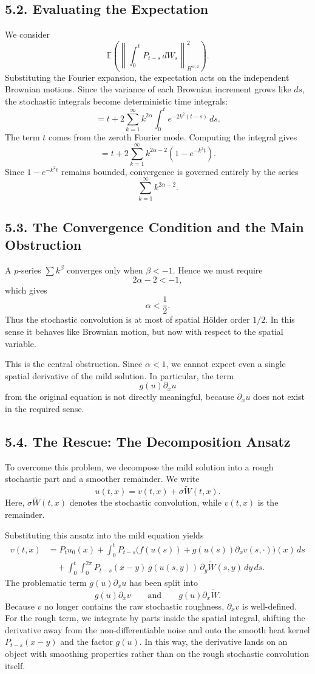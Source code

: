 \documentclass[11pt]{article}
\theoremstyle{definition}
\theoremstyle{remark}
\begin{document}
\subsection*{5.2. Evaluating the Expectation}
We consider
\[
\mathbb E\left(
\left\|
\int_0^t P_{t-s}\,dW_s
\right\|_{H^{\alpha,2}}^2
\right).
\]
Substituting the Fourier expansion, the expectation acts on the independent Brownian motions. Since the variance of each Brownian increment grows like \(ds\), the stochastic integrals become deterministic time integrals:
\[
=
t
+
2\sum_{k=1}^\infty
k^{2\alpha}
\int_0^t e^{-2k^2(t-s)}\,ds.
\]
The term \(t\) comes from the zeroth Fourier mode. Computing the integral gives
\[
=
t
+
2\sum_{k=1}^\infty
k^{2\alpha-2}(1-e^{-k^2 t}).
\]
Since \(1-e^{-k^2 t}\) remains bounded, convergence is governed entirely by the series
\[
\sum_{k=1}^\infty k^{2\alpha-2}.
\]

\subsection*{5.3. The Convergence Condition and the Main Obstruction}
A \(p\)-series \(\sum k^\beta\) converges only when \(\beta<-1\). Hence we must require
\[
2\alpha-2<-1,
\]
which gives
\[
\alpha<\frac12.
\]
Thus the stochastic convolution is at most of spatial Hölder order \(1/2\). In this sense it behaves like Brownian motion, but now with respect to the spatial variable.

This is the central obstruction. Since \(\alpha<1\), we cannot expect even a single spatial derivative of the mild solution. In particular, the term
\[
g(u)\partial_x u
\]
from the original equation is not directly meaningful, because \(\partial_x u\) does not exist in the required sense.

\subsection*{5.4. The Rescue: The Decomposition Ansatz}
To overcome this problem, we decompose the mild solution into a rough stochastic part and a smoother remainder. We write
\[
u(t,x)=v(t,x)+\sigma \widetilde W(t,x).
\]
Here, \(\sigma \widetilde W(t,x)\) denotes the stochastic convolution, while \(v(t,x)\) is the remainder.

Substituting this ansatz into the mild equation yields
\[
\begin{aligned}
v(t,x)
&=
P_tu_0(x)
+
\int_0^t
P_{t-s}\bigl(f(u(s))+g(u(s))\partial_x v(s,\cdot)\bigr)(x)\,ds \\
&\quad
+
\int_0^t\int_0^{2\pi}
P_{t-s}(x-y)\,g(u(s,y))\,\partial_y \widetilde W(s,y)\,dy\,ds.
\end{aligned}
\]
The problematic term \(g(u)\partial_x u\) has been split into
\[
g(u)\partial_x v
\qquad\text{and}\qquad
g(u)\partial_x \widetilde W.
\]
Because \(v\) no longer contains the raw stochastic roughness, \(\partial_x v\) is well-defined. For the rough term, we integrate by parts inside the spatial integral, shifting the derivative away from the non-differentiable noise and onto the smooth heat kernel \(P_{t-s}(x-y)\) and the factor \(g(u)\). In this way, the derivative lands on an object with smoothing properties rather than on the rough stochastic convolution itself.
\end{document}

